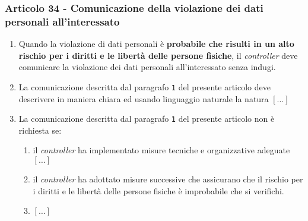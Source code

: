         \subsubsection{Articolo 34 - Comunicazione della violazione dei dati personali all'interessato}
            \begin{enumerate}
                \item Quando la violazione di dati personali è \textbf{probabile che risulti in un alto rischio per i diritti e le libertà delle persone fisiche}, il \textit{controller} deve comunicare la violazione dei dati personali all'interessato senza indugi.
                \item La comunicazione descritta dal paragrafo \texttt{1} del presente articolo deve descrivere in maniera chiara ed usando linguaggio naturale la natura $[\dots]$
                \item La comunicazione descritta dal paragrafo \texttt{1} del presente articolo non è richiesta se:
                    \begin{enumerate}
                        \item il \textit{controller} ha implementato misure tecniche e organizzative adeguate $[\dots]$
                        \item il \textit{controller} ha adottato misure successive che assicurano che il rischio per i diritti e le libertà delle persone fisiche è improbabile che si verifichi.
                        \item $[\dots]$
                    \end{enumerate}
            \end{enumerate}
